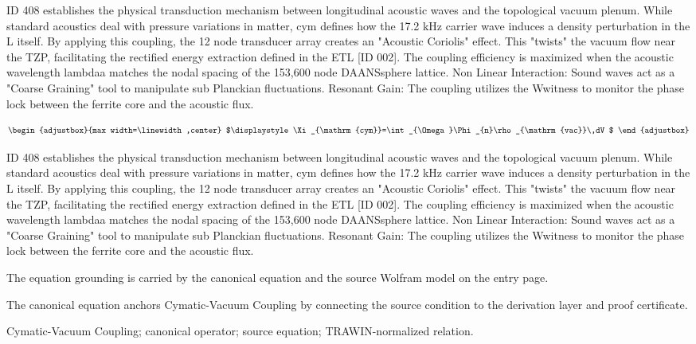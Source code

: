 ID 408 establishes the physical transduction mechanism between longitudinal acoustic waves and the topological vacuum plenum. While standard acoustics deal with pressure variations in matter, cym defines how the 17.2 kHz carrier wave induces a density perturbation in the L itself. By applying this coupling, the 12 node transducer array creates an "Acoustic Coriolis" effect. This "twists" the vacuum flow near the TZP, facilitating the rectified energy extraction defined in the ETL [ID 002]. The coupling efficiency is maximized when the acoustic wavelength lambdaa matches the nodal spacing of the 153,600 node DAANSsphere lattice. Non Linear Interaction: Sound waves act as a "Coarse Graining" tool to manipulate sub Planckian fluctuations. Resonant Gain: The coupling utilizes the Wwitness to monitor the phase lock between the ferrite core and the acoustic flux.

\[
\begin{adjustbox}{max width=\linewidth,center}
$\displaystyle
\Xi_{\mathrm{cym}}=\int_{\Omega}\Phi_{n}\rho_{\mathrm{vac}}\,dV
$
\end{adjustbox}
\]

ID 408 establishes the physical transduction mechanism between longitudinal acoustic waves and the topological vacuum plenum. While standard acoustics deal with pressure variations in matter, cym defines how the 17.2 kHz carrier wave induces a density perturbation in the L itself. By applying this coupling, the 12 node transducer array creates an "Acoustic Coriolis" effect. This "twists" the vacuum flow near the TZP, facilitating the rectified energy extraction defined in the ETL [ID 002]. The coupling efficiency is maximized when the acoustic wavelength lambdaa matches the nodal spacing of the 153,600 node DAANSsphere lattice. Non Linear Interaction: Sound waves act as a "Coarse Graining" tool to manipulate sub Planckian fluctuations. Resonant Gain: The coupling utilizes the Wwitness to monitor the phase lock between the ferrite core and the acoustic flux.

The equation grounding is carried by the canonical equation and the source Wolfram model on the entry page.

The canonical equation anchors Cymatic-Vacuum Coupling by connecting the source condition to the derivation layer and proof certificate.

Cymatic-Vacuum Coupling; canonical operator; source equation; TRAWIN-normalized relation.
\endgroup

